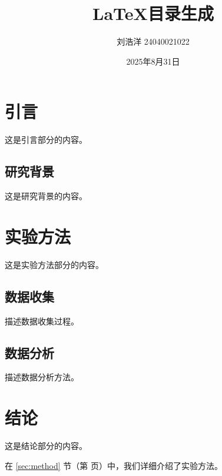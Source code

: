 \documentclass{article}
\title{LaTeX目录生成}
\author{刘浩洋 24040021022}
\date{2025年8月31日}
\begin{document}
\maketitle %

\tableofcontents %
\newpage %

\section{引言}
这是引言部分的内容。

\subsection{研究背景}
这是研究背景的内容。

\section{实验方法}
这是实验方法部分的内容。

\subsection{数据收集}
描述数据收集过程。

\subsection{数据分析}
描述数据分析方法。

\section{结论}
这是结论部分的内容。

在 \ref{sec:method} 节（第 \pageref{sec:method} 页）中，我们详细介绍了实验方法。
\label{sec:method} %
\end{document}
